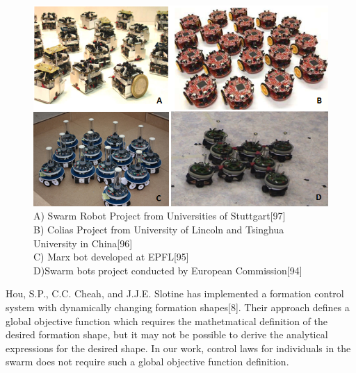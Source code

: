 \begin{figure}[H]
\captionsetup{format=hang,justification=centerfirst}
\caption{A) Swarm Robot Project from Universities of Stuttgart[97]  \\
B) Colias Project from University of Lincoln and Tsinghua\\ University in China[96]\\
C) Marx bot developed at EPFL[95] \\
D)Swarm bots project conducted by  European Commission[94]}
\centering
\includegraphics[scale = 0.8]{mobilerobots}
\end{figure}

Hou, S.P., C.C. Cheah, and J.J.E. Slotine has implemented a formation control system with dynamically changing formation shapes[8]. Their approach defines a global objective function which requires the mathetmatical definition of the desired formation shape, but it may not be possible to derive the analytical expressions for the desired shape. In our work, control laws for individuals in the swarm does not require such a global objective function definition.

